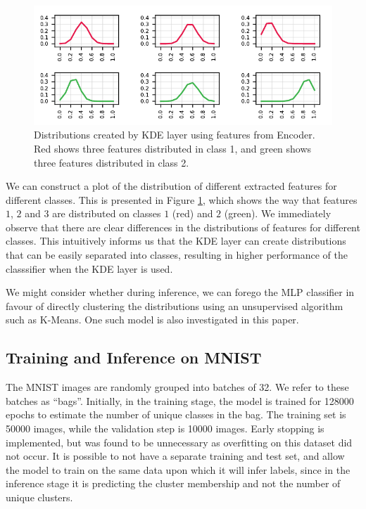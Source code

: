 \documentclass{article} %
\begin{document}
\begin{figure}[H]
    \centering
    \includegraphics[scale=0.7]{images/distributions-crop.pdf}
    \caption{Distributions created by KDE layer using features from Encoder. Red shows three features distributed in class 1, and green shows three features distributed in class 2.}
    \label{fig:kde_dens}
\end{figure}

We can construct a plot of the distribution of different extracted features for different classes. This is presented in Figure \ref{fig:kde_dens}, which shows the way that features $1$, $2$ and $3$ are distributed on classes $1$ (red) and $2$ (green). We immediately observe that there are clear differences in the distributions of features for different classes. This intuitively informs us that the KDE layer can create distributions that can be easily separated into classes, resulting in higher performance of the classsifier when the KDE layer is used.

We might consider whether during inference, we can forego the MLP classifier in favour of directly clustering the distributions using an unsupervised algorithm such as K-Means. One such model is also investigated in this paper.

\subsection{Training and Inference on MNIST} %

The MNIST images are randomly grouped into batches of 32. We refer to these batches as ``bags''. Initially, in the training stage, the model is trained for 128000 epochs to estimate the number of unique classes in the bag. The training set is 50000 images, while the validation step is 10000 images. Early stopping is implemented, but was found to be unnecessary as overfitting on this dataset did not occur. It is possible to not have a separate training and test set, and allow the model to train on the same data upon which it will infer labels, since in the inference stage it is predicting the cluster membership and not the number of unique clusters.
\end{document}
